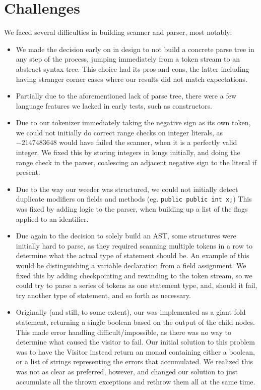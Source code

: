 \documentclass{article}
\begin{document}
\section{Challenges}
We faced several difficulties in building scanner and parser, most notably:
\begin{itemize}
    \item We made the decision early on in design to not build a concrete parse tree in any step of the process, jumping immediately from a token stream to an abstract syntax tree. This choice had its pros and cons, the latter including having stranger corner cases where our results did not match expectations.
    \item Partially due to the aforementioned lack of parse tree, there were a few language features we lacked in early tests, such as constructors.
    \item Due to our tokenizer immediately taking the negative sign as its own token, we could not initially do correct range checks on integer literals, as $-2147483648$ would have failed the scanner, when it is a perfectly valid integer. We fixed this by storing integers in longs initially, and doing the range check in the parser, coalescing an adjacent negative sign to the literal if present.
    \item Due to the way our weeder was structured, we could not initially detect duplicate modifiers on fields and methods (eg. \texttt{public public int x;}) This was fixed by adding logic to the parser, when building up a list of the flags applied to an identifier.
    \item Due again to the decision to solely build an AST, some structures were initially hard to parse, as they required scanning multiple tokens in a row to determine what the actual type of statement should be. An example of this would be distinguishing a variable declaration from a field assignment. We fixed this by adding checkpointing and rewinding to the token stream, so we could try to parse a series of tokens as one statement type, and, should it fail, try another type of statement, and so forth as necessary.
    \item Originally (and still, to some extent), our  was implemented as a giant fold statement, returning a single boolean based on the output of the child nodes. This made error handling difficult/impossible, as there was no way to determine what caused the visitor to fail. Our initial solution to this problem was to have the Visitor instead return an  monad containing either a boolean, or a list of strings representing the errors that accumulated. We realized this was not as clear as preferred, however, and changed our solution to just accumulate all the thrown exceptions and rethrow them all at the same time.

\end{itemize}
\end{document}
